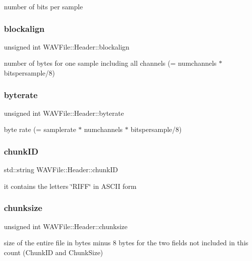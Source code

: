 number of bits per sample \mbox{\label{struct_w_a_v_file_1_1_header_a5c212f5f08c59f8487ccc3d066753892}} 
\subsubsection{blockalign}
{\footnotesize\ttfamily unsigned int W\+A\+V\+File\+::\+Header\+::blockalign}

number of bytes for one sample including all channels (= numchannels $\ast$ bitspersample/8) \mbox{\label{struct_w_a_v_file_1_1_header_ac6e4c7534bfdd6e9cbd4b73079438e7f}} 
\subsubsection{byterate}
{\footnotesize\ttfamily unsigned int W\+A\+V\+File\+::\+Header\+::byterate}

byte rate (= samplerate $\ast$ numchannels $\ast$ bitspersample/8) \mbox{\label{struct_w_a_v_file_1_1_header_a796a84d05ba0ddeb837804dff90b730b}} 
\subsubsection{chunk\+ID}
{\footnotesize\ttfamily std\+::string W\+A\+V\+File\+::\+Header\+::chunk\+ID}

it contains the letters \char`\"{}\+R\+I\+F\+F\char`\"{} in A\+S\+C\+II form \mbox{\label{struct_w_a_v_file_1_1_header_aee17e466b00a8b1d274be731f58d5fc0}} 
\subsubsection{chunksize}
{\footnotesize\ttfamily unsigned int W\+A\+V\+File\+::\+Header\+::chunksize}

size of the entire file in bytes minus 8 bytes for the two fields not included in this count (Chunk\+ID and Chunk\+Size) \mbox{\label{struct_w_a_v_file_1_1_header_aa3a54e23ce34d6f9cba9e9853915e30c}} 
